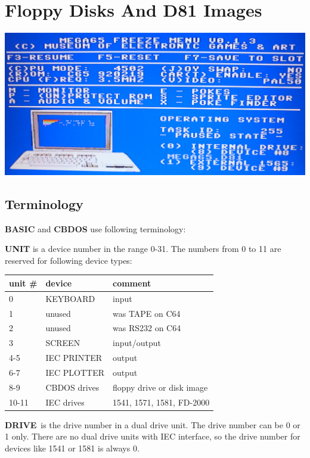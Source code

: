 \chapter{Floppy Disks And D81 Images}
\label{cha:freezer}


\includegraphics[width=\linewidth]{images/freezer.jpg}

\section{Terminology}

{\bf BASIC} and {\bf CBDOS} use following terminology:

{\bf UNIT} is a device number in the range 0-31.
The numbers from 0 to 11 are reserved for following device types:

{\ttfamily
\setlength{\tabcolsep}{1mm}
\begin{tabular}{|l|l|l|}
\hline
 unit \# & device  & comment \\
\hline
0        & KEYBOARD & input \\
1        & unused   & was TAPE on C64 \\
2        & unused   & was RS232 on C64 \\
3        & SCREEN   & input/output     \\
4-5      & IEC PRINTER  & output     \\
6-7      & IEC PLOTTER  & output     \\
8-9      & CBDOS drives & floppy drive or disk image \\
10-11    & IEC drives   & 1541, 1571, 1581, FD-2000 \\
\hline
\end{tabular}
}

{\bf DRIVE} is the drive number in a dual drive unit.
The drive number can be 0 or 1 only.
There are no dual drive units with IEC interface,
so the drive number for devices like 1541 or 1581 is always 0.

